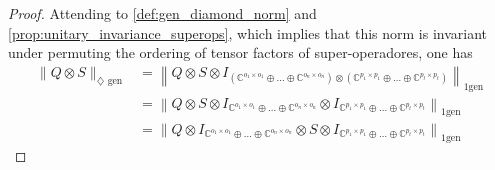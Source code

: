 \begin{proof}
Attending to \autoref{def:gen_diamond_norm} and \autoref{prop:unitary_invariance_superops}, which implies that this norm
is invariant under permuting the ordering of tensor factors of super-operadores, one has
\begin{equation} \label{eq:q_otimes_s_gen_diamond_inv_u}
  \begin{split}
    \lVert Q \otimes S \rVert_{\diamondsuit \text{ gen}} & = \left\lVert  Q \otimes S \otimes I_{\left(\mathbb{C}^{o_1 \times o_1} \oplus \ldots \oplus \mathbb{C}^{o_n \times o_n}\right) \otimes \left(\mathbb{C}^{p_1 \times p_1} \oplus \ldots \oplus \mathbb{C}^{p_t \times p_t}\right)} \right\rVert_{1 \text{gen}}\\
    & = \left\lVert  Q \otimes S \otimes   I_{\mathbb{C}^{o_1 \times o_1} \oplus \ldots \oplus \mathbb{C}^{o_n \times o_n}} \otimes I_{\mathbb{C}^{p_1 \times p_1} \oplus \ldots \oplus \mathbb{C}^{p_t \times p_t}} \right\rVert_{1 \text{gen}}\\
    &=\left\lVert  Q \otimes  I_{\mathbb{C}^{o_1 \times o_1} \oplus \ldots \oplus \mathbb{C}^{o_n \times o_n}} \otimes S \otimes  I_{\mathbb{C}^{p_1 \times p_1} \oplus \ldots \oplus \mathbb{C}^{p_t \times p_t}} \right\rVert_{1 \text{gen}}
  \end{split}
\end{equation}


\end{proof}
